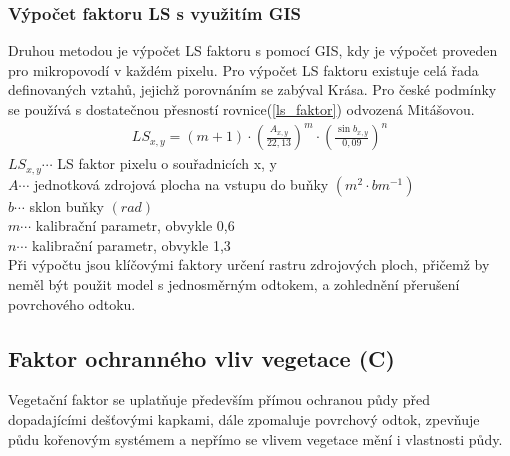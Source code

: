 \subsubsection{Výpočet faktoru LS s využitím GIS} 
Druhou metodou je výpočet LS faktoru s pomocí GIS, kdy je výpočet
proveden pro mikropovodí v každém pixelu. Pro výpočet LS faktoru
existuje celá řada definovaných vztahů, jejichž porovnáním se zabýval
Krása\cite{Krasa2010}. Pro české podmínky se používá s dostatečnou
přesností rovnice(\ref{ls_faktor}) odvozená
Mitášovou\cite{Mitasova1998}.\cite{Dostal2014}
\begin{align}
   \label{ls_faktor} LS_{x,y}=\left( m+1 \right)\cdot\left(\frac{A_{x,y}}{22,13}\right)^m \cdot \left(\frac{\sin b_{x,y}}{0,09}\right)^n
\end{align}
\hspace*{2cm}$LS_{x,y} \cdots$ LS faktor pixelu o souřadnicích x, y
\\ \hspace*{2cm}$A \cdots$ jednotková zdrojová plocha na vstupu do
buňky $\left( m^2\cdot bm^{-1} \right)$ \\
\hspace*{2cm}$b \cdots$ sklon buňky $\left( rad \right)$ \\
\hspace*{2cm}$m \cdots$ kalibrační parametr, obvykle 0,6\\
\hspace*{2cm}$n \cdots$ kalibrační parametr, obvykle 1,3\\

Při výpočtu jsou klíčovými faktory určení rastru zdrojových ploch,
přičemž by neměl být použit model s jednosměrným odtokem, a zohlednění
přerušení povrchového odtoku.\cite{Krasa2010}

\subsection{Faktor ochranného vliv vegetace (C)}
Vegetační faktor se uplatňuje především přímou ochranou půdy před
dopadajícími dešťovými kapkami, dále zpomaluje povrchový odtok,
zpevňuje půdu kořenovým systémem a nepřímo se vlivem vegetace mění i
vlastnosti půdy.

